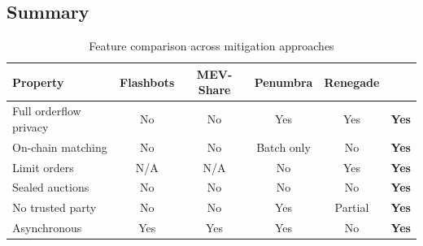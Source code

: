 \subsection{Summary}

\begin{table}[h]
\centering
\small
\begin{tabular}{lccccc}
\toprule
\textbf{Property} & \textbf{Flashbots} & \textbf{MEV-Share} & \textbf{Penumbra} & \textbf{Renegade} & \textbf{\Zoo{}} \\
\midrule
Full orderflow privacy & No & No & Yes & Yes & \textbf{Yes} \\
On-chain matching & No & No & Batch only & No & \textbf{Yes} \\
Limit orders & N/A & N/A & No & Yes & \textbf{Yes} \\
Sealed auctions & No & No & No & No & \textbf{Yes} \\
No trusted party & No & No & Yes & Partial & \textbf{Yes} \\
Asynchronous & Yes & Yes & Yes & No & \textbf{Yes} \\
\bottomrule
\end{tabular}
\caption{Feature comparison across \MEV{} mitigation approaches}
\label{tab:feature_comparison}
\end{table}

